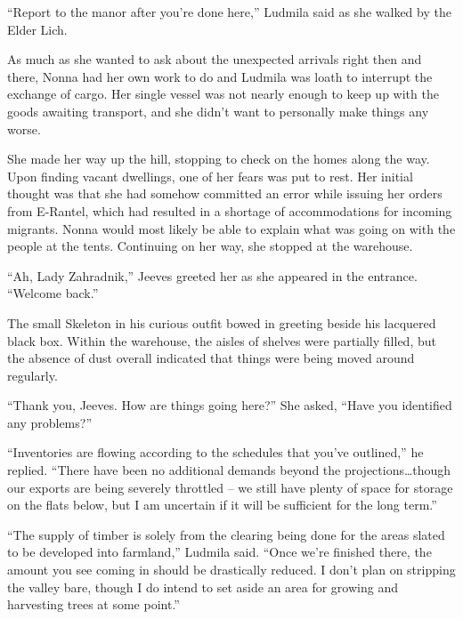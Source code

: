 

“Report to the manor after you’re done here,” Ludmila said as she walked by the Elder Lich.

 

As much as she wanted to ask about the unexpected arrivals right then and there, Nonna had her own work to do and Ludmila was loath to interrupt the exchange of cargo. Her single vessel was not nearly enough to keep up with the goods awaiting transport, and she didn’t want to personally make things any worse.

 

She made her way up the hill, stopping to check on the homes along the way. Upon finding vacant dwellings, one of her fears was put to rest. Her initial thought was that she had somehow committed an error while issuing her orders from E-Rantel, which had resulted in a shortage of accommodations for incoming migrants. Nonna would most likely be able to explain what was going on with the people at the tents. Continuing on her way, she stopped at the warehouse.

 

“Ah, Lady Zahradnik,” Jeeves greeted her as she appeared in the entrance. “Welcome back.”

 

The small Skeleton in his curious outfit bowed in greeting beside his lacquered black box. Within the warehouse, the aisles of shelves were partially filled, but the absence of dust overall indicated that things were being moved around regularly.

 

“Thank you, Jeeves. How are things going here?” She asked, “Have you identified any problems?”

 

“Inventories are flowing according to the schedules that you’ve outlined,” he replied. “There have been no additional demands beyond the projections…though our exports are being severely throttled – we still have plenty of space for storage on the flats below, but I am uncertain if it will be sufficient for the long term.”

 

“The supply of timber is solely from the clearing being done for the areas slated to be developed into farmland,” Ludmila said. “Once we’re finished there, the amount you see coming in should be drastically reduced. I don’t plan on stripping the valley bare, though I do intend to set aside an area for growing and harvesting trees at some point.”

